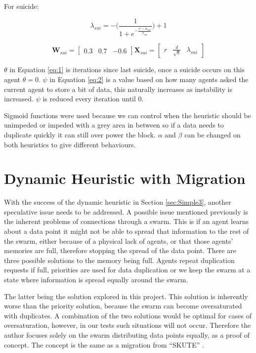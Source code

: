 \documentclass{UoYCSproject}
\begin{document}
For suicide:

\begin{equation}
\label{eq:2}
\lambda_{sui} = - \big( \frac{1}{1+ e^{- \frac{\psi - \alpha_{sui} }{ \beta_{sui} } } } \big) + 1
\end{equation}

\begin{equation}
\label{eq:101}
\textbf{W}_{sui} = \begin{bmatrix}0.3 & 0.7 & -0.6 \end{bmatrix}
\textbf{X}_{sui} = \begin{bmatrix} r & \frac{d}{\sqrt{8}} & \lambda_{sui} \end{bmatrix}
\end{equation}

$\theta$ in Equation \ref{eq:1} is iterations since last suicide, once a suicide occurs on this agent $\theta=0$.
$\psi$ in Equation \ref{eq:2} is a value based on how many agents asked the current agent to store a bit of data, this naturally increases as instability is increased.
$\psi$ is reduced every iteration until 0.

Sigmoid functions were used because we can control when the heuristic should be unimpeded or impeded with a grey area in between so if a data needs to duplicate quickly it can still over power the block.
$\alpha$ and $\beta$ can be changed on both heuristics to give different behaviours.


\section{Dynamic Heuristic with Migration}
\label{sec:Simple4}

With the success of the dynamic heuristic in Section \ref{sec:Simple3}, another speculative issue needs to be addressed. 
A possible issue mentioned previously is the inherent problems of connections through a swarm. 
This is if an agent learns about a data point it might not be able to spread that information to the rest of the swarm, either because of a physical lack of agents, or that those agents' memories are full, therefore stopping the spread of the data point. 
There are three possible solutions to the memory being full. 
Agents repeat duplication requests if full, priorities are used for data duplication or we keep the swarm at a state where information is spread equally around the swarm.

The latter being the solution explored in this project. 
This solution is inherently worse than the priority solution, because the swarm can become oversaturated with duplicates. 
A combination of the two solutions would be optimal for cases of oversaturation, however, in our tests such situations will not occur. 
Therefore the author focuses solely on the swarm distributing data points equally, as a proof of concept. 
The concept is the same as a migration from “SKUTE” \cite{Distributed Storage}.
\end{document}
